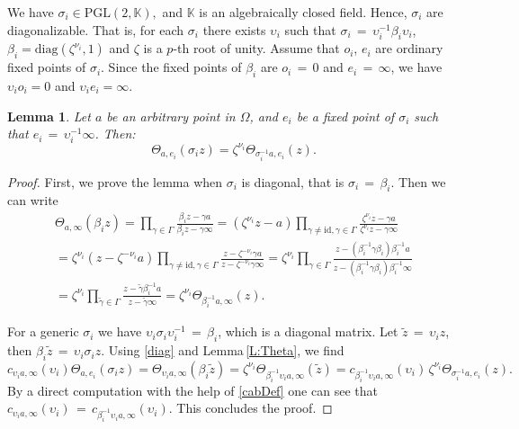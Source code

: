 \documentclass[]{amsart}
\numberwithin{equation}{section}
\newtheorem{lemma}[theorem]{Lemma}
\newcommand{\id}{\mathrm{id}}
\newcommand{\diag}{\mathrm{diag}}
\begin{document}
We have $\sigma_i\in \mathrm{PGL}(2,\mathbb{K}),$ and $\mathbb{K}$ is an algebraically closed field. 
Hence, $\sigma_i$ are diagonalizable.  That is, for each $\sigma_i$ there exists $\upsilon_i$ such that  
$\sigma_i \,{=}\,\upsilon_i^{-1} \beta_i \upsilon_i$, 
$\beta_i=\diag(\zeta^{\nu_i }, 1)$
and $\zeta$ is a $p$-th root of unity. Assume that $o_i$, $e_i$ are ordinary fixed points of $\sigma_i$. 
Since the fixed points of $\beta_i$ are  $o_i\,{=}\,0$ and $e_i\,{=}\, \infty$, we have
$\upsilon_i o_i =  0$ and $\upsilon_i e_i = \infty$. 
\begin{lemma}\label{ThetaSigma}
Let $a$ be an arbitrary point in $\Omega$, and $e_i$ be a
fixed point of $\sigma_i$ such that $e_i \,{=}\, \upsilon_i^{-1} \infty$. Then: 
\begin{equation}
\Theta_{a,e_i}(\sigma_i z) = \zeta^{\nu_i}\Theta_{\sigma_i^{-1}a, e_i}(z).
\end{equation}
\end{lemma}
\begin{proof}
First, we prove the lemma when $\sigma_i$ is diagonal, that is $\sigma_i\,{=}\,\beta_i$.  Then we can write
\begin{multline}\label{diag}
\Theta_{a,\infty}(\beta_i z) = \prod_{\gamma \in \Gamma}
\frac{\beta_i z-\gamma a}{\beta_i z- \gamma \infty}
=(\zeta^{\nu_i}z-a)\prod_{\gamma \neq \id,\gamma\in \Gamma}
\frac{\zeta^{\nu_i}z-\gamma a}{\zeta^{\nu_i}z-\gamma \infty}\\
=\zeta^{\nu_i}(z-\zeta^{-\nu_i}a) \prod_{\gamma \neq \id, \gamma\in \Gamma}
\frac{z-\zeta^{-\nu_i}\gamma a}{z-\zeta^{-\nu_i}\gamma \infty}
=\zeta^{\nu_i}\prod_{\gamma \in \Gamma}
\frac{z-(\beta_i^{-1}\gamma \beta_i) \beta_i^{-1} a}{z-(\beta_i^{-1}\gamma \beta_i) \beta_i^{-1} \infty} \\
=\zeta^{\nu_i}\prod_{\tilde{\gamma} \in \Gamma}
\frac{z-\tilde{\gamma} \beta_i^{-1} a}{z-\tilde{\gamma} \infty}
= \zeta^{\nu_i}\Theta_{\beta_i^{-1}a,\infty}(z).
\end{multline}

For a generic $\sigma_i$ we have $\upsilon_i \sigma_i \upsilon_i^{-1}\,{=}\, \beta_i$, which is a diagonal matrix. 
Let $\tilde{z} \,{=}\, \upsilon_i z$, then $\beta_i \tilde{z} \,{=}\, \upsilon_i \sigma_i z$.
Using \eqref{diag} and Lemma\,\ref{L:Theta}, we find
$$ c_{\upsilon_i a,\infty} (\upsilon_i) \Theta_{a, e_i}(\sigma_i z)  = \Theta_{\upsilon_i a,\infty}(\beta_i \tilde{z})  =  
\zeta^{\nu_i}\Theta_{\beta_i^{-1} \upsilon_i a,\infty}(\tilde{z}) 
=  c_{\beta_i^{-1} \upsilon_i a, \infty}(\upsilon_i)\, \zeta^{\nu_i} \Theta_{ \sigma_i^{-1} a, e_i}(z).$$
By a direct computation with the help of \eqref{cabDef} one can see
that $c_{\upsilon_i a,\infty} (\upsilon_i) \,{=}\, c_{\beta_i^{-1} \upsilon_i a,\infty}(\upsilon_i)$.
This concludes the proof.
\end{proof}
\end{document}
